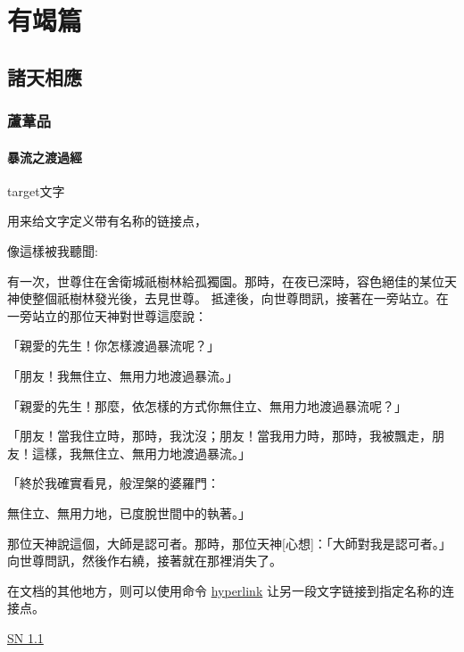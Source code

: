 \documentclass[a4paper,12pt,oneside]{book}
\begin{document}
\part{有竭篇}

\chapter{諸天相應}

\section{蘆葦品}

\subsection{暴流之渡過經}
\label{subsec:sn 1.1}
\hypertarget{sn 1.1}{target文字} 用来给文字定义带有名称的链接点，

像這樣被我聽聞:

有一次，世尊住在舍衛城祇樹林給孤獨園。那時，在夜已深時，容色絕佳的某位天神使整個祇樹林發光後，去見世尊。
抵達後，向世尊問訊，接著在一旁站立。在一旁站立的那位天神對世尊這麼說：

「親愛的先生！你怎樣渡過暴流呢？」

「朋友！我無住立、無用力地渡過暴流。」

「親愛的先生！那麼，依怎樣的方式你無住立、無用力地渡過暴流呢？」

「朋友！當我住立時，那時，我沈沒；朋友！當我用力時，那時，我被飄走，朋友！這樣，我無住立、無用力地渡過暴流。」

「終於我確實看見，般涅槃的婆羅門：

無住立、無用力地，已度脫世間中的執著。」

那位天神說這個，大師是認可者。那時，那位天神[心想]：「大師對我是認可者。」向世尊問訊，然後作右繞，接著就在那裡消失了。



在文档的其他地方，则可以使用命令
\hyperlink{sn 1.1}{hyperlink} 让另一段文字链接到指定名称的连接点。

\hyperref[subsec:sn 1.1]{SN 1.1}

\clearpage
\end{document}
